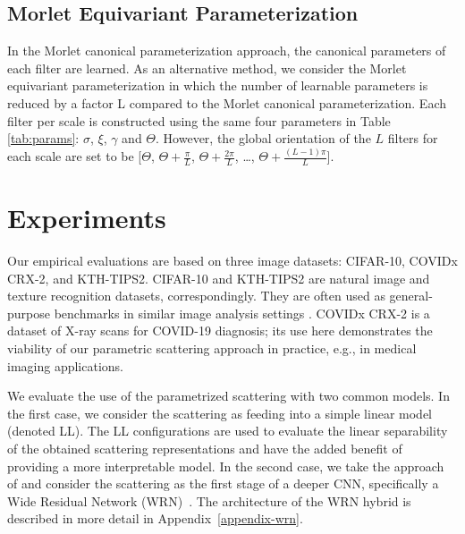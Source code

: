 \documentclass[10pt,twocolumn,letterpaper]{article}
\begin{document}
\subsection{Morlet Equivariant Parameterization }
\label{sec:eq}
In the Morlet canonical parameterization approach, the canonical parameters of each filter are learned. As an alternative method, we consider the Morlet equivariant parameterization in which the number of learnable parameters is reduced by a factor L compared to the Morlet canonical parameterization. Each filter per scale is constructed using the same four parameters in Table \ref{tab:params}: $\sigma$, $\xi$, $\gamma$ and $\Theta$. 
However, the global orientation of the $L$ filters for each scale are set to be [$\Theta$, $\Theta + \frac{\pi}{L}$, $\Theta + \frac{2\pi}{L}$, \ldots ,  $\Theta + \frac{(L-1)\pi}{L}$]. 







\section{Experiments}
\label{sec:exp-setup}
\label{sec:results}
Our empirical evaluations are based on three image datasets: CIFAR-10,  COVIDx CRX-2, and KTH-TIPS2. CIFAR-10 and KTH-TIPS2 are natural image and texture recognition datasets, correspondingly. They are often used as general-purpose benchmarks in similar image analysis settings \cite{glico,sifre2013rotation}. COVIDx CRX-2 is a dataset of X-ray scans for COVID-19 diagnosis; its use here demonstrates the viability of our parametric scattering approach in practice, e.g., in medical imaging applications.

We evaluate the use of the parametrized scattering with two common models. In the first case, we consider the scattering as feeding into a simple linear model (denoted LL). The LL configurations are used to evaluate the linear separability of the obtained scattering representations and have the added benefit of providing a more interpretable model. In the second case, we take the approach of \cite{oyallon2018replearning} and  consider the scattering as the first stage of a deeper CNN, specifically a Wide Residual Network (WRN)~\cite{wideresnet}. The architecture of the WRN hybrid is described in more detail in Appendix~\ref{appendix-wrn}.
\end{document}
